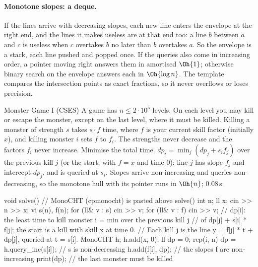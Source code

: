 \paragraph{Monotone slopes: a deque.} If the lines arrive with decreasing slopes, each new line enters the envelope at the right end, and
the lines it makes useless are at that end too: a line $b$ between $a$ and $c$ is useless when $c$ overtakes $b$ no later than $b$
overtakes $a$. So the envelope is a stack, each line pushed and popped once. If the queries also come in increasing order, a pointer
moving right answers them in amortised $\Oh{1}$; otherwise binary search on the envelope answers each in $\Oh{\log n}$. The template
compares the intersection points as exact fractions, so it never overflows or loses precision.

\begin{problem}{Monster Game I (CSES)}
A game has $n \le 2 \cdot 10^5$ levels. On each level you may kill or escape the monster, except on the last level, where it must be
killed. Killing a monster of strength $s$ takes $s \cdot f$ time, where $f$ is your current skill factor (initially $x$), and killing
monster $i$ sets $f$ to $f_i$. The strengths never decrease and the factors $f_i$ never increase. Minimise the total time.
\solution $dp_i = \min_j (dp_j + s_i f_j)$ over the previous kill $j$ (or the start, with $f = x$ and time 0): line $j$ has slope $f_j$
and intercept $dp_j$, and is queried at $s_i$. Slopes arrive non-increasing and queries non-decreasing, so the monotone hull with its
pointer runs in $\Oh{n}$; 0.08\,s.
\end{problem}

\begin{code}
void solve() {  // MonoCHT (cpmonocht) is pasted above solve()
    int n;
    ll x;
    cin >> n >> x;
    vi s(n), f(n);
    for (ll& v : s) cin >> v;
    for (ll& v : f) cin >> v;
    // dp[i]: the least time to kill monster i = min over the previous kill j
    // of dp[j] + s[i] * f[j]; the start is a kill with skill x at time 0.
    // Each kill j is the line y = f[j] * t + dp[j], queried at t = s[i].
    MonoCHT h;
    h.add(x, 0);
    ll dp = 0;
    rep(i, n) {
        dp = h.query_inc(s[i]);  // s is non-decreasing
        h.add(f[i], dp);  // the slopes f are non-increasing
    }
    print(dp);  // the last monster must be killed
}
\end{code}



